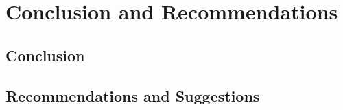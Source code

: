 \chapter{Conclusion and Recommendations}
\section{Conclusion}
\section{Recommendations and Suggestions}
